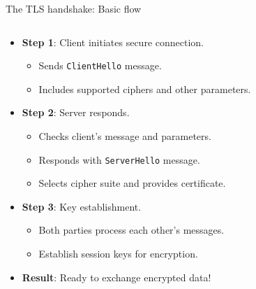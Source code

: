 \documentclass[aspectratio=169, lualatex, handout]{beamer}
\begin{document}
\begin{frame}{The TLS handshake: Basic flow}
	\begin{columns}[c]
		\begin{column}{0.6\textwidth}
			\begin{itemize}
				\item \textbf{Step 1}: Client initiates secure connection.
				      \begin{itemize}
					      \item Sends \texttt{ClientHello} message.
					      \item Includes supported ciphers and other parameters.
				      \end{itemize}
				\item \textbf{Step 2}: Server responds.
				      \begin{itemize}
					      \item Checks client's message and parameters.
					      \item Responds with \texttt{ServerHello} message.
					      \item Selects cipher suite and provides certificate.
				      \end{itemize}
				\item \textbf{Step 3}: Key establishment.
				      \begin{itemize}
					      \item Both parties process each other's messages.
					      \item Establish session keys for encryption.
				      \end{itemize}
				\item \textbf{Result}: Ready to exchange encrypted data!
			\end{itemize}
		\end{column}
		\begin{column}{0.4\textwidth}
		\end{column}
	\end{columns}
\end{frame}
\end{document}
